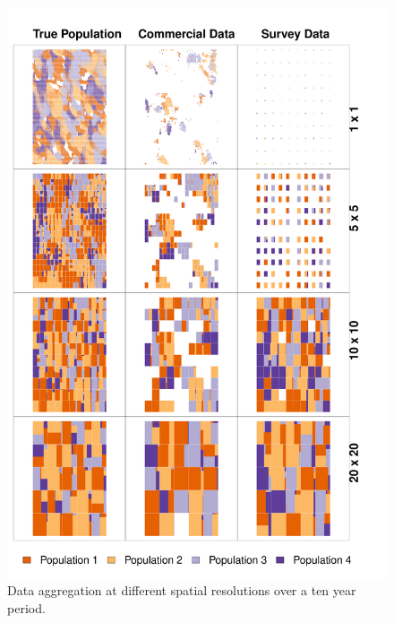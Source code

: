 \documentclass[review]{elsarticle}
\begin{document}
\begin{figure}[!ht]
	\includegraphics[width=\linewidth]{../analysis/Data_Aggregation_space_Rev2}
	\caption{Data aggregation at different spatial resolutions over a
		ten year period.}
	\label{fig:1}
\end{figure}	
\end{document}
